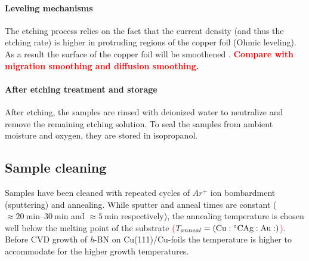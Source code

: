 \paragraph{Leveling mechanisms}
The etching process relies on the fact that the current density (and thus the etching rate) is higher in protruding regions of the copper foil (Ohmic leveling). As a result the surface of the copper foil will be smoothened \cite{luo_effect_2011}. \textcolor{red}{\textbf{Compare with migration smoothing and diffusion smoothing\cite{jinshan_electrochemical_2004}.}}

\paragraph{After etching treatment and storage}
After etching, the samples are rinsed with deionized water to neutralize and remove the remaining etching solution. To seal the samples from ambient moisture and oxygen, they are stored in isopropanol.


\subsection{Sample cleaning}
Samples have been cleaned with repeated cycles of $Ar^+$ ion bombardment (sputtering) and annealing. While sputter and anneal times are constant ($\approx \SIrange{20}{30}{\minute}$ and $\approx \SI{5}{\minute}$ respectively), the annealing temperature is chosen well below the melting point of the substrate \textcolor{red}{($T_{anneal}=(\textnormal{Cu}: \SI{}{\celsius} \textnormal{Ag}: \textnormal{Au}: )$)}. Before CVD growth of \textit{h}-BN on Cu(111)/Cu-foils the temperature is higher to accommodate for the higher growth temperatures.

